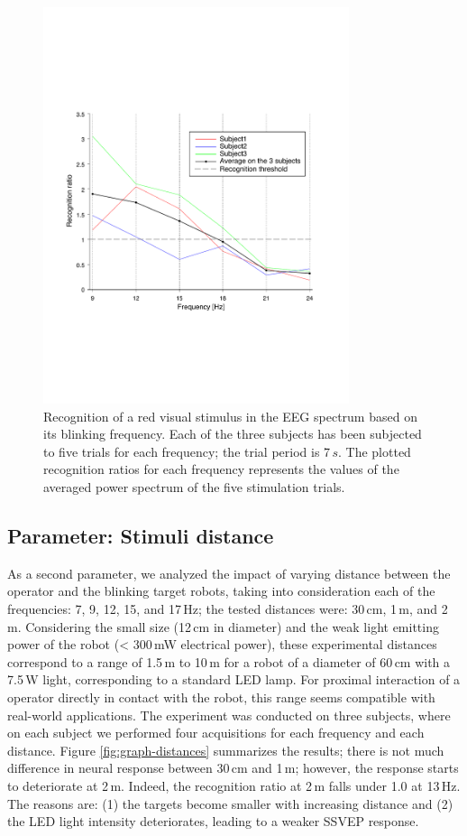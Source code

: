 \documentclass[smallextended]{svjour3}
\begin{document}
\begin{figure}
\center
\includegraphics[width=0.8\textwidth]{figures/graph-frequences.pdf}
\caption{Recognition of a red visual stimulus in the EEG spectrum based on its blinking frequency. Each of the three subjects has been subjected to five trials for each frequency; the trial period is 7\,$s$. The plotted recognition ratios for each frequency represents the values of the averaged power spectrum of the five stimulation trials.} \label{fig:graph-frequences}
\end{figure}

\subsection{Parameter: Stimuli distance}
As a second parameter, we analyzed the impact of varying distance between the operator and the blinking target robots, taking into consideration each of the frequencies: 7, 9, 12, 15, and 17\,Hz; the tested distances were: 30\,cm, 1\,m, and 2\,m. 
Considering the small size (12\,cm in diameter) and the weak light emitting power of the robot (< 300\,mW electrical power), these experimental distances correspond to a range of 1.5\,m to 10\,m for a robot of a diameter of 60\,cm with a 7.5\,W light, corresponding to a standard LED lamp. 
For proximal interaction of a operator directly in contact with the robot, this range seems compatible with real-world applications.
The experiment was conducted on three subjects, where on each subject we performed four acquisitions for each frequency and each distance. 
Figure \ref{fig:graph-distances} summarizes the results; there is not much difference in neural response between 30\,cm and 1\,m; however, the response starts to deteriorate at 2\,m. Indeed, the recognition ratio at 2\,m falls under 1.0 at 13\,Hz. 
The reasons are: (1) the targets become smaller with increasing distance and (2) the LED light intensity deteriorates, leading to a weaker SSVEP response.
\end{document}
